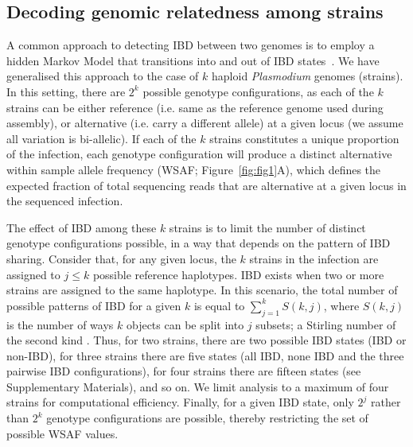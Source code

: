 \documentclass[9pt,lineno]{elife}
\begin{document}
\subsection{Decoding genomic relatedness among strains}

A common approach to detecting IBD between two genomes is to employ a hidden Markov Model that transitions into and out of IBD states~\citep{Chang2015, Gusev2009, Gusev2011}.  We have generalised this approach to the case of $k$ haploid {\it Plasmodium} genomes (strains). In this setting, there are $2^k$ possible genotype configurations, as each of the $k$ strains can be either reference (i.e. same as the reference genome used during assembly), or alternative (i.e. carry a different allele) at a given locus (we assume all variation is bi-allelic). If each of the $k$ strains constitutes a unique proportion of the infection, each genotype configuration will produce a distinct alternative within sample allele frequency (WSAF; Figure~\ref{fig:fig1}A), which defines the expected fraction of total sequencing reads that are alternative at a given locus in the sequenced infection.

The effect of IBD among these $k$ strains is to limit the number of distinct genotype configurations possible, in a way that depends on the pattern of IBD sharing. Consider that, for any given locus, the $k$ strains in the infection are assigned to $j \leq k$ possible reference haplotypes. IBD exists when two or more strains are assigned to the same haplotype. In this scenario, the total number of possible patterns of IBD for a given $k$ is equal to $\sum_{j=1}^{k} S(k,j)$, where $S(k,j)$ is the number of ways $k$ objects can be split into $j$ subsets; a Stirling number of the second kind \citep{Ronald1988}. Thus, for two strains, there are two possible IBD states (IBD or non-IBD), for three strains there are five states (all IBD, none IBD and the three pairwise IBD configurations), for four strains there are fifteen states (see Supplementary Materials), and so on. We limit analysis to a maximum of four strains for computational efficiency. Finally, for a given IBD state, only $2^j$ rather than $2^k$ genotype configurations are possible, thereby restricting the set of possible WSAF values.
\end{document}
